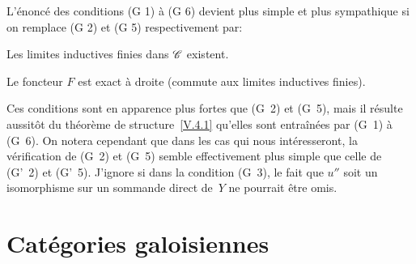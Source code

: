 \begin{remarques}
\label{V.4.2}
L'\'enonc\'e des conditions (G 1) \`a (G 6) devient plus simple
et plus sympathique si on remplace (G 2) et (G 5) respectivement par:
\begin{enumerateb}
\item[(G' 2)] Les limites inductives finies dans
$\cal{C}$
existent.
\item[(G' 5)] Le foncteur $F$ est exact \`a droite (\ie commute aux
limites inductives finies).
\end{enumerateb}
Ces conditions sont en apparence plus fortes que (G~2) et (G~5), mais
il r\'esulte aussit\^ot du th\'eor\`eme de
structure~\ref{V.4.1} qu'elles sont entra\^in\'ees par (G~1)
\`a (G~6). On notera cependant que dans les cas qui nous
int\'eresseront, la v\'erification de (G~2) et (G~5) semble
effectivement plus simple que celle de (G'~2) et (G'~5). J'ignore si
dans la condition (G~3), le fait que $u''$ soit un isomorphisme sur un
sommande direct de~$Y$ ne pourrait \^etre omis.
\end{remarques}

\section{Cat\'egories galoisiennes}
\label{V.5}

